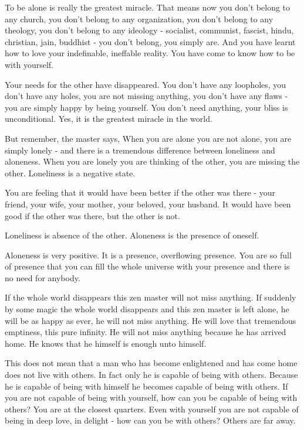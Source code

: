 To be alone is really the greatest miracle. That means now you don't belong to any church, you don't belong to any organization, you don't belong to any theology, you don't belong to any ideology - socialist, communist, fascist, hindu, christian, jain, buddhist - you don't belong, you simply are. And you have learnt how to love your indefinable, ineffable reality. You have come to know how to be with yourself.

Your needs for the other have disappeared. You don't have any loopholes, you don't have any holes, you are not missing anything, you don't have any flaws - you are simply happy by being yourself. You don't need anything, your bliss is unconditional. Yes, it is the greatest miracle in the world.

But remember, the master says,  When you are alone you are not alone, you are simply lonely - and there is a tremendous difference between loneliness and aloneness. When you are lonely you are thinking of the other, you are missing the other. Loneliness is a negative state.

You are feeling that it would have been better if the other was there - your friend, your wife, your mother, your beloved, your husband. It would have been good if the other was there, but the other is not.

Loneliness is absence of the other. Aloneness is the presence of oneself.

Aloneness is very positive. It is a presence, overflowing presence. You are so full of presence that you can fill the whole universe with your presence and there is no need for anybody.

If the whole world disappears this zen master will not miss anything. If suddenly by some magic the whole world disappears and this zen master is left alone, he will be as happy as ever, he will not miss anything. He will love that tremendous emptiness, this pure infinity. He will not miss anything because he has arrived home. He knows that he himself is enough unto himself.

This does not mean that a man who has become enlightened and has come home does not live with others. In fact only he is capable of being with others. Because he is capable of being with himself he becomes capable of being with others. If you are not capable of being with yourself, how can you be capable of being with others? You are at the closest quarters. Even with yourself you are not capable of being in deep love, in delight - how can you be with others? Others are far away.

